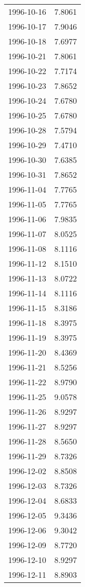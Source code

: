 \begin{tabular}{lr}
1996-10-16 &      7.8061 \\
1996-10-17 &      7.9046 \\
1996-10-18 &      7.6977 \\
1996-10-21 &      7.8061 \\
1996-10-22 &      7.7174 \\
1996-10-23 &      7.8652 \\
1996-10-24 &      7.6780 \\
1996-10-25 &      7.6780 \\
1996-10-28 &      7.5794 \\
1996-10-29 &      7.4710 \\
1996-10-30 &      7.6385 \\
1996-10-31 &      7.8652 \\
1996-11-04 &      7.7765 \\
1996-11-05 &      7.7765 \\
1996-11-06 &      7.9835 \\
1996-11-07 &      8.0525 \\
1996-11-08 &      8.1116 \\
1996-11-12 &      8.1510 \\
1996-11-13 &      8.0722 \\
1996-11-14 &      8.1116 \\
1996-11-15 &      8.3186 \\
1996-11-18 &      8.3975 \\
1996-11-19 &      8.3975 \\
1996-11-20 &      8.4369 \\
1996-11-21 &      8.5256 \\
1996-11-22 &      8.9790 \\
1996-11-25 &      9.0578 \\
1996-11-26 &      8.9297 \\
1996-11-27 &      8.9297 \\
1996-11-28 &      8.5650 \\
1996-11-29 &      8.7326 \\
1996-12-02 &      8.8508 \\
1996-12-03 &      8.7326 \\
1996-12-04 &      8.6833 \\
1996-12-05 &      9.3436 \\
1996-12-06 &      9.3042 \\
1996-12-09 &      8.7720 \\
1996-12-10 &      8.9297 \\
1996-12-11 &      8.8903 \\

\end{tabular}
